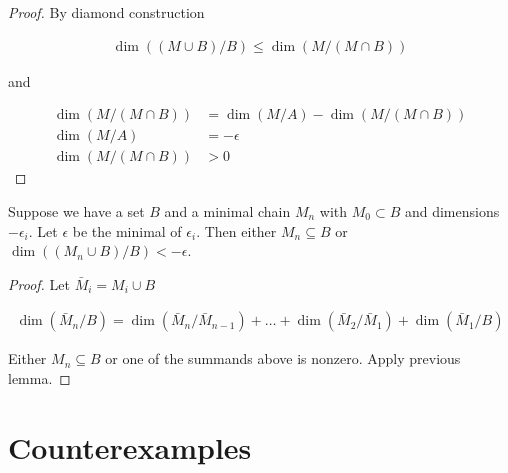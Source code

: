 \documentclass{amsart}
\renewcommand{\AA}{\mathscr A}
\begin{document}
\begin{proof}
	By diamond construction

	\begin{align*}
		\dim((M \cup B)/B) \leq \dim(M / (M \cap B))
	\end{align*}

	and 

	\begin{align*}
		\dim(M / (M \cap B)) &= \dim (M/A) - \dim(M / (M \cap B)) \\
		\dim (M/A) &= -\epsilon \\
		\dim(M / (M \cap B)) &> 0
	\end{align*}
\end{proof}



\begin{Lemma}	\label{chain_lemma}
	Suppose we have a set $B$ and a minimal chain $M_n$ with $M_0 \subset B$ and dimensions $-\epsilon_i$.
Let $\epsilon$ be the minimal of $\epsilon_i$.
Then either $M_n \subseteq B$ or $\dim((M_n \cup B)/B) < -\epsilon$.
\end{Lemma}


\begin{proof}
	Let $\bar M_i = M_i \cup B$

	\begin{align*}
		\dim(\bar M_n/B) = \dim(\bar M_n/\bar M_{n-1}) + \ldots + \dim(\bar M_2/\bar M_1) + \dim(\bar M_1/B)
	\end{align*}

	Either $M_n \subseteq B$ or one of the summands above is nonzero.
	Apply previous lemma.
\end{proof}

\section{Counterexamples}



\end{document}
